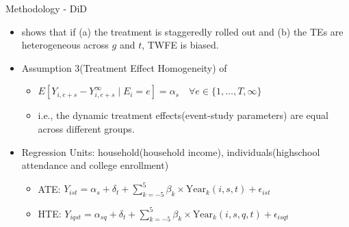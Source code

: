 \documentclass[12pt,  aspectratio=169]{beamer}    %
\begin{document}
\begin{frame}{Methodology  -  \textcite{sun_estimating_2021}  DiD}
    \begin{itemize}
        \item  \textcite{de2020two}  shows  that  if  (a)  the  treatment  is  staggeredly  rolled  out  and  (b)  the  TEs  are  heterogeneous  across  $g$  and  $t$,  TWFE  is  biased.
        \vfill
        \item  Assumption  3(Treatment  Effect  Homogeneity)  of  \textcite{sun_estimating_2021}
        \begin{itemize}
            \item  $E[Y_{i,e+s}  -  Y_{i,  e+s}^\infty  \mid  E_i  =  e]  =  \alpha_s  \quad  \forall  e  \in  \{1,  \ldots,  T,  \infty\}$
            \item  i.e.,  the  dynamic  treatment  effects(event-study  parameters)  are  equal  across  different  groups.
        \end{itemize}
        \vfill
        \item  Regression  Units:  household(household  income),  individuals(highschool  attendance  and  college  enrollment)
        \begin{itemize}
            \item  ATE:  $Y_{ist}  =  \alpha_s  +  \delta_t  +  \sum_{k=-5}^{5}  \beta_k  \times  \text{Year}_k(i,  s,  t)  +  \epsilon_{ist}$
            \item  HTE:  $Y_{iqst}  =  \alpha_{sq}  +  \delta_t  +  \sum_{k=-5}^{5}  \beta_k  \times  \text{Year}_k(i,  s,  q,  t)  +  \epsilon_{isqt}$
        \end{itemize}
    \end{itemize}
\end{frame}

\end{document}
